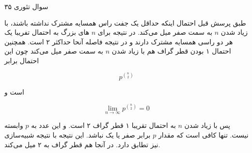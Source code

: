 سوال تئوری ۳۵

طبق پرسش قبل احتمال اینکه حداقل یک جفت راس همسایه مشترک نداشته باشند،
با زیاد شدن 
$n$
به سمت صفر میل می‌کند.
در نتیجه برای
$n$
های بزرگ به احتمال تفریبا یک هر دو راسی همسایه مشترک دارند و در نتیجه فاصله آنحا حداکثر ۲ است.
همچنین احتمال ۱ بودن قطر گراف هم با زیاد شدن 
$n$
به سمت صفر میل می‌کند چون این احتمال برابر 

$$ p^{\binom{n}{2}} $$

است و

$$ \lim \limits_{n \to \infty} p^{\binom{n}{2}} = 0 $$


پس با زیاد شدن 
$n$
به احتمال تقریبا ۱ قطر گراف ۲ است.
و این عدد به
$p$
وابسته نیست.
تنها کافی است که مقدار 
$p$
برابر صفر یا یک نباشد.
این نتیجه با نتیجه شبیه‌سازی نیز تطابق دارد.
در آنجا هم قطر گراف به ۲ میل می‌کند.